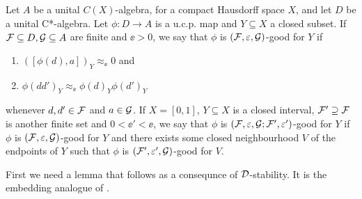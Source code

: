 \documentclass[12pt]{amsart}
\begin{document}
\begin{defn}
Let $A$ be a unital $C(X)$-algebra, for a compact Hausdorff space $X$, and let $D$ be a unital C*-algebra. Let $\phi: D \to A$ is a u.c.p. map and $Y \subseteq X$ a closed subset. If $\mathcal{F} \subseteq D, \mathcal{G} \subseteq A$ are finite and $\ee > 0$, we say that $\phi$ is $(\mathcal{F},\varepsilon,\mathcal{G})$-good for $Y$ if
\begin{enumerate}
\item $([\phi(d),a])_Y \approx_\ee 0$ and
\item $\phi(dd')_Y \approx_\ee \phi(d)_Y\phi(d')_Y$
\end{enumerate}
whenever $d,d' \in \mathcal{F}$ and $a \in \mathcal{G}$. If $X = [0,1]$, $Y \subseteq X$ is a closed interval, $\mathcal{F}' \supseteq \mathcal{F}$ is another finite set and $0 < \ee' < \ee$, we say that $\phi$ is $(\mathcal{F},\varepsilon,\mathcal{G};\mathcal{F}',\varepsilon')$-good for $Y$ if $\phi$ is $(\mathcal{F},\varepsilon,\mathcal{G})$-good for $Y$ and there exists some closed neighbourhood $V$ of the endpoints of $Y$ such that $\phi$ is $(\mathcal{F}',\varepsilon',\mathcal{G})$-good for $V$. 
\end{defn}

First we need a lemma that follows as a consequnce of $\mathcal{D}$-stability. It is the embedding analogue of \cite[Proposition 4.1]{HirshbergRordamWinter07}.
\end{document}
